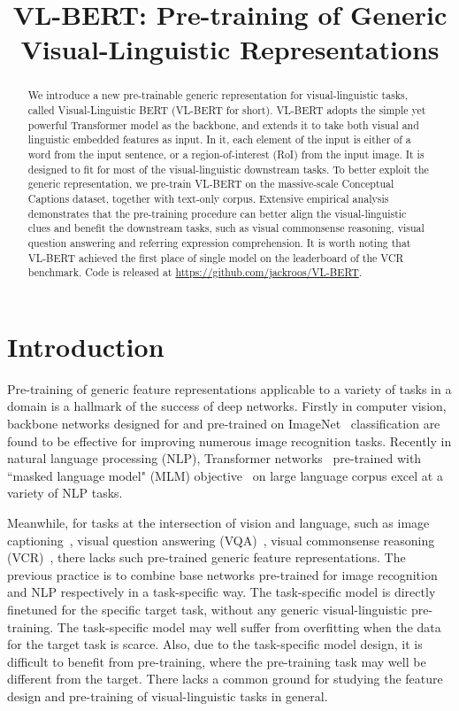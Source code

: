 \title{VL-BERT: Pre-training of Generic Visual-Linguistic Representations}

\begin{abstract}
We introduce a new pre-trainable generic representation for visual-linguistic tasks, called Visual-Linguistic BERT (VL-BERT for short). VL-BERT adopts the simple yet powerful Transformer model as the backbone, and extends it to take both visual and linguistic embedded features as input. In it, each element of the input is either of a word from the input sentence, or a region-of-interest (RoI) from the input image. It is designed to fit for most of the visual-linguistic downstream tasks. To better exploit the generic representation, we pre-train VL-BERT on the massive-scale Conceptual Captions dataset, together with text-only corpus. Extensive empirical analysis demonstrates that the pre-training procedure can better align the visual-linguistic clues and benefit the downstream tasks, such as visual commonsense reasoning, visual question answering and referring expression comprehension. It is worth noting that VL-BERT achieved the first place of single model on the leaderboard of the VCR benchmark. Code is released at \url{https://github.com/jackroos/VL-BERT}.
\end{abstract}

\section{Introduction}
Pre-training of generic feature representations applicable to a variety of tasks in a domain is a hallmark of the success of deep networks. Firstly in computer vision, backbone networks designed for and pre-trained on ImageNet~\citep{deng2009imagenet} classification are found to be effective for improving numerous image recognition tasks. Recently in natural language processing (NLP), Transformer networks~\citep{vaswani2017transformer} pre-trained with ``masked language model" (MLM) objective~\citep{devlin2018bert} on large language corpus excel at a variety of NLP tasks.

Meanwhile, for tasks at the intersection of vision and language, such as image captioning~\citep{young2014image,chen2015microsoft,sharma2018conceptual}, visual question answering (VQA)~\citep{antol2015vqa,johnson2017clevr,goyal2017making,hudson2019gqa}, visual commonsense reasoning (VCR)~\citep{zellers2019vcr,gao2019two}, there lacks such pre-trained generic feature representations. The previous practice is to combine base networks pre-trained for image recognition and NLP respectively in a task-specific way. The task-specific model is directly finetuned for the specific target task, without any generic visual-linguistic pre-training. The task-specific model may well suffer from overfitting when the data for the target task is scarce. Also, due to the task-specific model design, it is difficult to benefit from pre-training, where the pre-training task may well be different from the target. There lacks a common ground for studying the feature design and pre-training of visual-linguistic tasks in general.

